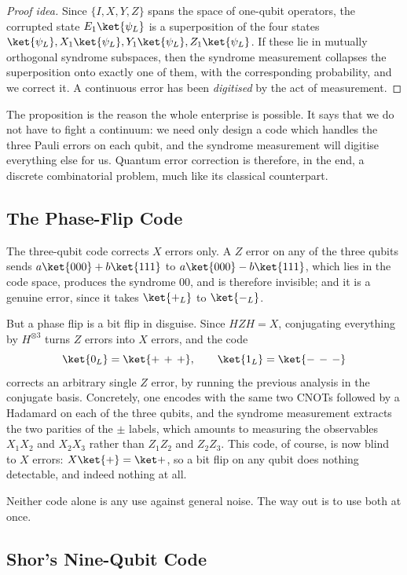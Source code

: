 \begin{proof}[Proof idea]
	Since $\{I,X,Y,Z\}$ spans the space of one-qubit operators, the corrupted state $E_1\ket{\psi_L}$ is a superposition of the four states $\ket{\psi_L}, X_1\ket{\psi_L},Y_1\ket{\psi_L},Z_1\ket{\psi_L}$. If these lie in mutually orthogonal syndrome subspaces, then the syndrome measurement collapses the superposition onto exactly one of them, with the corresponding probability, and we correct it. A continuous error has been \emph{digitised} by the act of measurement.
\end{proof}

The proposition is the reason the whole enterprise is possible. It says that we do not have to fight a continuum: we need only design a code which handles the three Pauli errors on each qubit, and the syndrome measurement will digitise everything else for us. Quantum error correction is therefore, in the end, a discrete combinatorial problem, much like its classical counterpart.

\subsection{The Phase-Flip Code}

The three-qubit code corrects $X$ errors only. A $Z$ error on any of the three qubits sends $a\ket{000}+b\ket{111}$ to $a\ket{000}-b\ket{111}$, which lies in the code space, produces the syndrome $00$, and is therefore invisible; and it is a genuine error, since it takes $\ket{+_L}$ to $\ket{-_L}$.

But a phase flip is a bit flip in disguise. Since $HZH = X$, conjugating everything by $H^{\otimes3}$ turns $Z$ errors into $X$ errors, and the code
$$\ket{0_L} = \ket{+\,+\,+}, \qquad \ket{1_L} = \ket{-\,-\,-}$$
corrects an arbitrary single $Z$ error, by running the previous analysis in the conjugate basis. Concretely, one encodes with the same two CNOTs followed by a Hadamard on each of the three qubits, and the syndrome measurement extracts the two parities of the $\pm$ labels, which amounts to measuring the observables $X_1X_2$ and $X_2X_3$ rather than $Z_1Z_2$ and $Z_2Z_3$. This code, of course, is now blind to $X$ errors: $X\ket{+} = \ket+$, so a bit flip on any qubit does nothing detectable, and indeed nothing at all.

Neither code alone is any use against general noise. The way out is to use both at once.

\subsection{Shor's Nine-Qubit Code}

